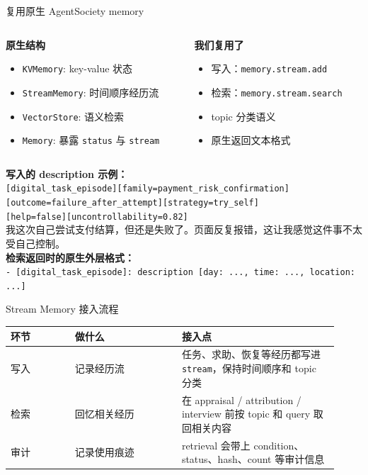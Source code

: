\documentclass[aspectratio=169]{beamer}
\begin{document}
\begin{frame}[t]{复用原生 AgentSociety memory}
\small
\begin{columns}[T]
\begin{column}{0.48\textwidth}
\textbf{原生结构}
\begin{itemize}
    \item \texttt{KVMemory}: key-value 状态
    \item \texttt{StreamMemory}: 时间顺序经历流
    \item \texttt{VectorStore}: 语义检索
    \item \texttt{Memory}: 暴露 \texttt{status} 与 \texttt{stream}
\end{itemize}
\end{column}

\begin{column}{0.48\textwidth}
\textbf{我们复用了}
\begin{itemize}
    \item 写入：\texttt{memory.stream.add}
    \item 检索：\texttt{memory.stream.search}
    \item topic 分类语义
    \item 原生返回文本格式
\end{itemize}
\end{column}
\end{columns}

\vspace{0.18cm}
\scriptsize
\textbf{写入的 description 示例：}\\
\texttt{[digital\_task\_episode][family=payment\_risk\_confirmation]}\\
\texttt{[outcome=failure\_after\_attempt][strategy=try\_self]}\\
\texttt{[help=false][uncontrollability=0.82]}\\
我这次自己尝试支付结算，但还是失败了。页面反复报错，这让我感觉这件事不太受自己控制。\\
\vspace{0.08cm}
\textbf{检索返回时的原生外层格式：}\\
\texttt{- [digital\_task\_episode]: description [day: ..., time: ..., location: ...]}
\end{frame}

\begin{frame}[t]{Stream Memory 接入流程}
\scriptsize
\vspace{1.05cm}
\renewcommand{\arraystretch}{1.18}
\begin{tabular}{@{}L{0.18\linewidth}L{0.30\linewidth}L{0.44\linewidth}@{}}
\toprule
环节 & 做什么 & 接入点 \\
\midrule
写入 & 记录经历流 & 任务、求助、恢复等经历都写进 \texttt{stream}，保持时间顺序和 topic 分类 \\
检索 & 回忆相关经历 & 在 appraisal / attribution / interview 前按 topic 和 query 取回相关内容 \\
审计 & 记录使用痕迹 & retrieval 会带上 condition、status、hash、count 等审计信息 \\
\bottomrule
\end{tabular}
\end{frame}
\end{document}
